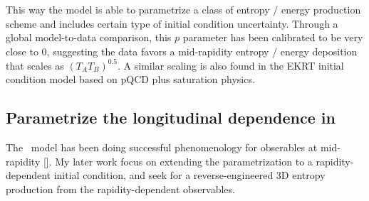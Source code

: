 This way the model is able to parametrize a class of entropy / energy production scheme and includes certain type of initial condition uncertainty.
Through a global model-to-data comparison, this $p$ parameter has been calibrated to be very close to 0, suggesting the data favors a mid-rapidity entropy / energy deposition that scales as $(T_A T_B)^{0.5}$.
A similar scaling is also found in the EKRT initial condition model based on pQCD plus saturation physics.

\subsection{Parametrize the longitudinal dependence in \trento}
The \trento\ model has been doing successful phenomenology for obserables at mid-rapidity [].
My later work focus on extending the parametrization to a rapidity-dependent initial condition, and seek for a reverse-engineered 3D entropy production from the rapidity-dependent observables.

